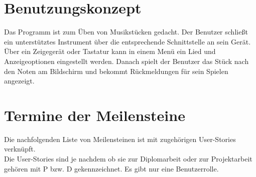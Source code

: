\documentclass[12pt,a4paper]{report}
\begin{document}
    \section{Benutzungskonzept}
      Das Programm ist zum Üben von Musikstücken gedacht. Der Benutzer schließt ein unterstütztes Instrument über die entsprechende Schnittstelle an sein Gerät. Über ein Zeigegerät oder Tastatur kann in einem Menü ein Lied und Anzeigeoptionen  eingestellt werden. Danach spielt der Benutzer das Stück nach den Noten am Bildschirm und bekommt Rückmeldungen für sein Spielen angezeigt.
    \newpage
    \section{Termine der Meilensteine}
    Die nachfolgenden Liste von Meilensteinen ist mit zugehörigen User-Stories verknüpft.\\
    Die User-Stories sind je nachdem ob sie zur Diplomarbeit oder zur Projektarbeit gehören mit P bzw. D gekennzeichnet.
    Es gibt nur eine Benutzerrolle.
\end{document}
